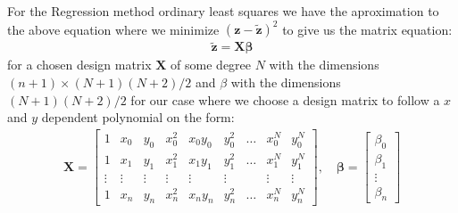 \documentclass[12pt]{article}
\begin{document}
For the Regression method ordinary least squares we have the aproximation to the above equation where we minimize $(\boldsymbol{z} - \boldsymbol{\tilde{z}})^2$ to give us the matrix equation:
\begin{align*}
  \boldsymbol{\tilde{z}} = \boldsymbol{X}\boldsymbol{\beta}
\end{align*}
for a chosen design matrix $\boldsymbol{X}$ of some degree $N$ with the dimensions $(n+1)\times (N+1)(N+2)/2$ and $\beta$ with the dimensions $(N+1)(N+2)/2$  for our case where we choose a design matrix to follow a $x$ and $y$ dependent polynomial on the form:
\begin{align*}
  \boldsymbol{X} = \begin{bmatrix}
    1 & x_0 & y_0 & x_0^2 & x_0y_0 & y_0^2 & \hdots &x_0^N & y_0^N \\
    1 & x_1 & y_1 & x_1^2 & x_1y_1 & y_1^2 &\hdots& x_1^N & y_1^N \\
    \vdots & \vdots & \vdots & \vdots & \vdots &\vdots & &\vdots & \vdots \\
    1 & x_n & y_n & x_n^2 & x_ny_n & y_n^2 &\hdots& x_n^N & y_n^N
\end{bmatrix}
, \quad
\boldsymbol{\beta} =
\begin{bmatrix}
  \beta_0 \\
  \beta_1 \\
  \vdots \\
  \beta_n
\end{bmatrix}
\end{align*}
\end{document}
